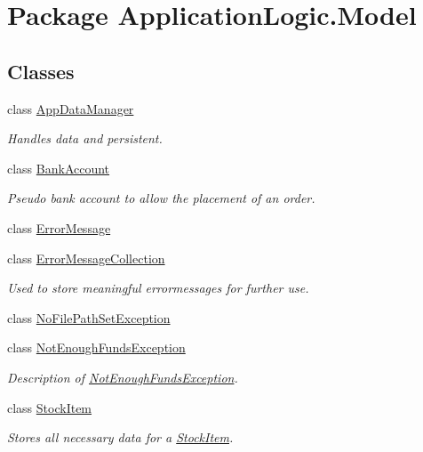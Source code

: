 \hypertarget{namespace_application_logic_1_1_model}{
\section{Package ApplicationLogic.Model}
\label{namespace_application_logic_1_1_model}
}
\subsection*{Classes}
\begin{DoxyCompactItemize}
\item 
class \hyperlink{class_application_logic_1_1_model_1_1_app_data_manager}{AppDataManager}
\begin{DoxyCompactList}\small\item\em Handles data and persistent. \item\end{DoxyCompactList}\item 
class \hyperlink{class_application_logic_1_1_model_1_1_bank_account}{BankAccount}
\begin{DoxyCompactList}\small\item\em Pseudo bank account to allow the placement of an order. \item\end{DoxyCompactList}\item 
class \hyperlink{class_application_logic_1_1_model_1_1_error_message}{ErrorMessage}
\item 
class \hyperlink{class_application_logic_1_1_model_1_1_error_message_collection}{ErrorMessageCollection}
\begin{DoxyCompactList}\small\item\em Used to store meaningful errormessages for further use. \item\end{DoxyCompactList}\item 
class \hyperlink{class_application_logic_1_1_model_1_1_no_file_path_set_exception}{NoFilePathSetException}
\item 
class \hyperlink{class_application_logic_1_1_model_1_1_not_enough_funds_exception}{NotEnoughFundsException}
\begin{DoxyCompactList}\small\item\em Description of \hyperlink{class_application_logic_1_1_model_1_1_not_enough_funds_exception}{NotEnoughFundsException}. \item\end{DoxyCompactList}\item 
class \hyperlink{class_application_logic_1_1_model_1_1_stock_item}{StockItem}
\begin{DoxyCompactList}\small\item\em Stores all necessary data for a \hyperlink{class_application_logic_1_1_model_1_1_stock_item}{StockItem}. \item\end{DoxyCompactList}\end{DoxyCompactItemize}
